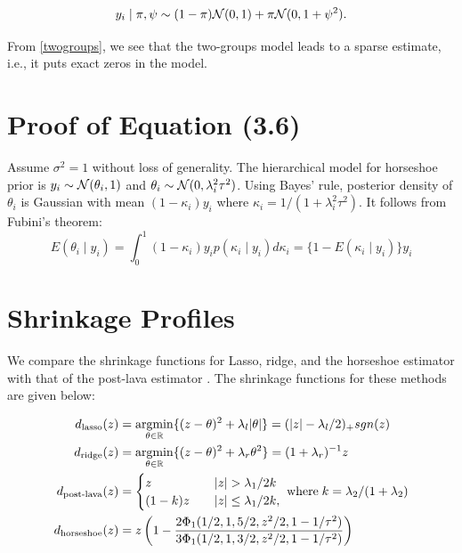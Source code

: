 \documentclass[sts,preprint]{imsart}
\begin{document}
\begin{appendix}
\begin{equation}
y_i \mid \pi, \psi \sim  (1-\pi) {\cal N}(0, 1) + \pi {\cal N}(0, 1+\psi^2). \label{twogroups}
\end{equation}

From \eqref{twogroups}, we see that the two-groups model leads to a sparse
estimate, i.e., it puts exact zeros in the model. 

\section{Proof of Equation (3.6)}\label{sec:proof}

Assume $\sigma^2 = 1$ without loss of generality. The hierarchical model for horseshoe prior is $y_i \sim {\cal N}(\theta_i,1)$ and $\theta_i \sim {\cal N}(0, \lambda_i^2 \tau^2)$. Using Bayes' rule, posterior density of $\theta_i$ is Gaussian with mean $(1-\kappa_i)y_i$ where $\kappa_i = 1 / (1 + \lambda_i^2 \tau^2)$. It follows from Fubini's theorem:
\[
E(\theta_i \mid y_i) = \int_0^1 (1-\kappa_i)y_i p(\kappa_i \mid y_i) d \kappa_i = \{1 - E(\kappa_i \mid y_i)\} y_i 
\]

\section{Shrinkage Profiles}\label{sec:shrink}
We compare the shrinkage functions for Lasso, ridge, and the horseshoe estimator with that of the post-lava estimator \citep{chernozhukov2017lava}. The shrinkage functions for these methods are given below:

\begin{align}
d_{\text{lasso}}(z) & = \argmin_{\theta \in \mathbb{R}} \{ (z-\theta)^2 + \lambda_l \abs{\theta} \} = (\abs{z} - \lambda_l/2)_{+} sgn(z) \\
d_{\text{ridge}}(z) & = \argmin_{\theta \in \mathbb{R}} \{ (z-\theta)^2 + \lambda_r \theta^2 \}= (1 + \lambda_r)^{-1} z \\
d_{\text{post-lava}}(z) & = \begin{cases} 
                                         z & \quad \abs{z} > \lambda_1/2k \\
                                         (1-k)z & \quad \abs{z} \le \lambda_1/2k,
                                        \end{cases}
\; \text{where} \; k = \lambda_2/ (1 + \lambda_2) \\
d_{\text{horseshoe}}(z) & = z \left( 1 - \frac{2 \Phi_1(1/2,1,5/2,z^2/2,1-1/\tau^2)}{3\Phi_1(1/2,1,3/2, z^2/2, 1 - 1/\tau^2)} \right) 
\end{align}


\end{appendix}
\end{document}
